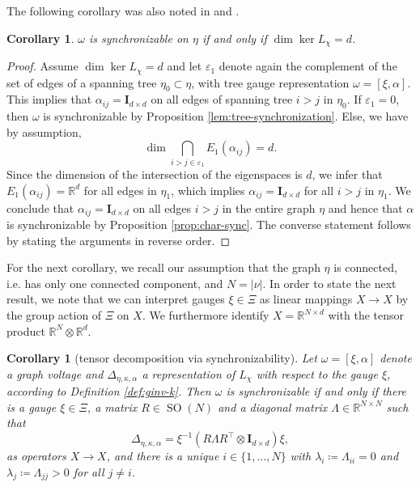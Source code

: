 \documentclass[10pt,reqno]{amsart}
\numberwithin{equation}{section}
\theoremstyle{bfnote}
\newtheorem{corollary}[theorem]{Corollary}
\theoremstyle{bfdef}
\newcommand{\R}{\mathbb{R}}
\newcommand{\veps}{\varepsilon}
\newcommand{\II}{\mathbf{I}_{d \times d}}
\renewcommand\o\operatorname
\providecommand\gt; %
\renewcommand{\gt}{\xi}
\providecommand\a; %
\renewcommand{\a}{\alpha}
\providecommand\E; %
\renewcommand{\E}{E}
\providecommand\Lpl; %
\renewcommand{\Lpl}{\Delta}
\providecommand\hgen; %
\renewcommand{\hgen}{L}
\providecommand\vg; %
\renewcommand{\vg}{\chi}
\begin{document}
			The following corollary was also noted in \cite[Proposition 2.1]{gaoGeometrySynchronizationProblems2019} and \cite[Lemma 6]{bodnarNeuralSheafDiffusion2023}.
		
		\begin{corollary}\label{cor:synchronizable}
			$\omega$ is synchronizable on $\eta$ if and only if $\dim \ker \hgen_{\vg} = d$.
		\end{corollary}

		\begin{proof}
			Assume $\dim \ker \hgen_{\vg} = d$ and let $\veps_1$ denote again the complement of the set of edges of a spanning tree $\eta_0 \subset \eta$, with tree gauge representation $\omega=[\gt,\a]$. 
			This implies that $\alpha_{ij} = \II$ on all edges of spanning tree $i > j$ in $\eta_{0}$. 
			If $\veps_{1} = 0$, then $\omega$ is synchronizable by Proposition \ref{lem:tree-synchronization}. Else, we have by assumption,
			\begin{equation}
				\dim \bigcap_{i > j \in \veps_{1}} \E_{1}(\a_{ij}) = d.
			\end{equation}
			Since the dimension of the intersection of the eigenspaces is $d$, we infer that $E_{1}(\a_{ij}) = \R^{d}$ for all edges in $\eta_1$, which implies $\a_{ij}=\II$ for all $i>j$ in $\eta_{1}$. We conclude that $\a_{ij}=\II$ on all edges $i>j$ in the entire graph $\eta$ and hence that $\alpha$ is synchronizable by Proposition \ref{prop:char-sync}. 
			The converse statement follows by stating the arguments in reverse order.
		\end{proof}

		For the next corollary, we recall our assumption that the graph $\eta$ is connected, i.e. has only one connected component, and $N = |\nu|$. In order to state the next result, we note that we can interpret gauges $\xi \in \Xi$ as linear mappings $X \to X$ by the group action of $\Xi$ on $X$. We furthermore identify $X = \R^{N \times d}$ with the tensor product $\R^{N}\otimes\R^{d}$.

		\begin{corollary}[tensor decomposition via synchronizability]\label{cor:tensor-decomp}
			Let $\omega = [\gt,\a]$ denote a graph voltage and $\Lpl_{\eta,\kappa,\alpha}$ a representation of $L_{\vg}$ with respect to the gauge $\gt$, according to Definition \ref{def:ginv-k}. Then $\omega$ is synchronizable if and only if there is a gauge $\xi \in \Xi$, a matrix $R \in \o{SO}(N)$ and a diagonal matrix $\Lambda \in \R^{N \times N}$ such that
			\begin{equation}\label{eq:decomp}
				\Delta_{\eta,\kappa,\alpha} = \xi^{-1} (R \Lambda R^{\top} \otimes \II) \xi,
			\end{equation}
			as operators $X \to X$, and there is a unique $i \in \{1,\dots,N\}$ with $\lambda_i \coloneqq \Lambda_{ii} = 0$ and $\lambda_j \coloneqq \Lambda_{jj} > 0$ for all $j \neq i$.
		\end{corollary}
\end{document}
